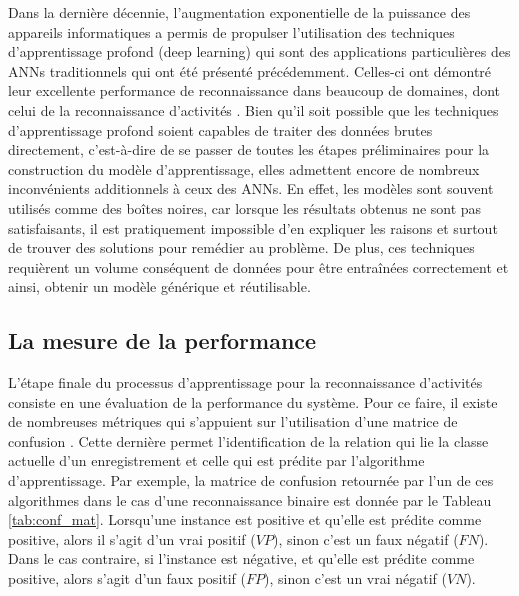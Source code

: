 Dans la dernière décennie, l'augmentation exponentielle de la puissance des appareils informatiques a permis de propulser l'utilisation des techniques d'apprentissage profond (deep learning) qui sont des applications particulières des \acsp{ANN} traditionnels qui ont été présenté précédemment. Celles-ci ont démontré leur excellente performance de reconnaissance dans beaucoup de domaines, dont celui de la reconnaissance d'activités \citep{Yang2015, Li2016, Wang2018}. Bien qu'il soit possible que les techniques d'apprentissage profond soient capables de traiter des données brutes directement, c'est-à-dire de se passer de toutes les étapes préliminaires pour la construction du modèle d'apprentissage, elles admettent encore de nombreux inconvénients additionnels à ceux des \acsp{ANN}. En effet, les modèles sont souvent utilisés comme des boîtes noires, car lorsque les résultats obtenus ne sont pas satisfaisants, il est pratiquement impossible d'en expliquer les raisons et surtout de trouver des solutions pour remédier au problème. De plus, ces techniques requièrent un volume conséquent de données pour être entraînées correctement et ainsi, obtenir un modèle générique et réutilisable.

\subsection{La mesure de la performance}

L'étape finale du processus d'apprentissage pour la reconnaissance d'activités consiste en une évaluation de la performance du système. Pour ce faire, il existe de nombreuses métriques qui s'appuient sur l'utilisation d'une matrice de confusion \citep{Fawcett2006}. Cette dernière permet l'identification de la relation qui lie la classe actuelle d'un enregistrement et celle qui est prédite par l'algorithme d'apprentissage. Par exemple, la matrice de confusion retournée par l'un de ces algorithmes dans le cas d'une reconnaissance binaire est donnée par le Tableau \ref{tab:conf_mat}. Lorsqu'une instance est positive et qu'elle est prédite comme positive, alors il s'agit d'un vrai positif ($VP$), sinon c'est un faux négatif ($FN$). Dans le cas contraire, si l'instance est négative, et qu'elle est prédite comme positive, alors s'agit d'un faux positif ($FP$), sinon c'est un vrai négatif ($VN$).

